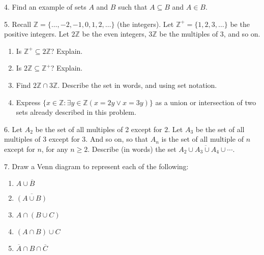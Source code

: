 \documentclass[10pt,]{book}
\theoremstyle{plain}
\theoremstyle{definition}
\theoremstyle{definition}
\theoremstyle{definition}
\theoremstyle{definition}
\numberwithin{equation}{chapter}
\newcommand{\Z}{\mathbb Z}
\newcommand{\st}{:}
\renewcommand{\bar}{\overline}
\begin{document}
\begin{exerciselist}
\par\smallskip
\item[4.]\hypertarget{exercise-71}{}\hypertarget{p-635}{}%
Find an example of sets \(A\) and \(B\) such that \(A \subseteq B\) and \(A \in B\).%
\par\smallskip
\item[5.]\hypertarget{exercise-72}{}\hypertarget{p-637}{}%
Recall \(\Z = \{\ldots,-2,-1,0, 1,2,\ldots\}\) (the integers). Let \(\Z^+ = \{1, 2, 3, \ldots\}\) be the positive integers. Let \(2\Z\) be the even integers, \(3\Z\) be the multiples of 3, and so on.%
\par
\hypertarget{p-638}{}%
\leavevmode%
\begin{enumerate}[label=(\alph*)]
\item\hypertarget{li-299}{}\hypertarget{p-639}{}%
Is \(\Z^+ \subseteq 2\Z\)? Explain.%
\item\hypertarget{li-300}{}\hypertarget{p-640}{}%
Is \(2\Z \subseteq \Z^+\)? Explain.%
\item\hypertarget{li-301}{}\hypertarget{p-641}{}%
Find \(2\Z \cap 3\Z\). Describe the set in words, and using set notation.%
\item\hypertarget{li-302}{}\hypertarget{p-642}{}%
Express \(\{x \in \Z \st \exists y\in \Z (x = 2y \vee x = 3y)\}\) as a union or intersection of two sets already described in this problem.%
\end{enumerate}
%
\par\smallskip
\item[6.]\hypertarget{exercise-73}{}\hypertarget{p-646}{}%
Let \(A_2\) be the set of all multiples of 2 except for \(2\). Let \(A_3\) be the set of all multiples of 3 except for 3. And so on, so that \(A_n\) is the set of all multiple of \(n\) except for \(n\), for any \(n \ge 2\). Describe (in words) the set \(\bar{A_2 \cup A_3 \cup A_4 \cup \cdots}\).%
\par\smallskip
\item[7.]\hypertarget{exercise-74}{}\hypertarget{p-647}{}%
Draw a Venn diagram to represent each of the following: \leavevmode%
\begin{enumerate}[label=(\alph*)]
\item\hypertarget{li-307}{}\(A \cup \bar B\)%
\item\hypertarget{li-308}{}\(\bar{(A \cup B)}\)%
\item\hypertarget{li-309}{}\(A \cap (B \cup C)\)%
\item\hypertarget{li-310}{}\((A \cap B) \cup C\)%
\item\hypertarget{li-311}{}\(\bar A \cap B \cap \bar C\)%

\end{enumerate}
\end{exerciselist}
\end{document}
